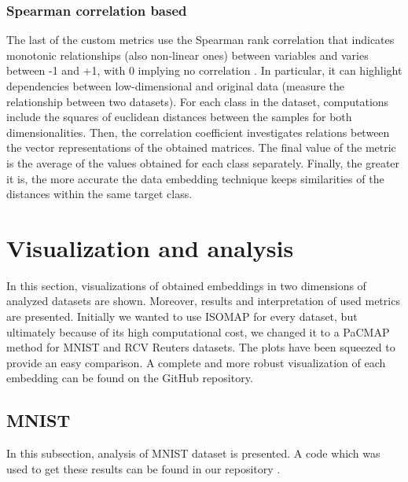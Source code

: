 \documentclass[12pt]{article}
\begin{document}
\subsubsection{Spearman correlation based}
The last of the custom metrics use the Spearman rank correlation that indicates monotonic relationships (also non-linear ones) between variables and varies between -1 and +1, with 0 implying no correlation \cite{spearman_description}. In particular, it can highlight dependencies between low-dimensional and original data (measure the relationship between two datasets). For each class in the dataset, computations include the squares of euclidean distances between the samples for both dimensionalities. Then, the correlation coefficient investigates relations between the vector representations of the obtained matrices. The final value of the metric is the average of the values obtained for each class separately. Finally, the greater it is, the more accurate the data embedding technique keeps similarities of the distances within the same target class.

\clearpage
\section{Visualization and analysis}

In this section, visualizations of obtained embeddings in two dimensions of analyzed datasets are shown. Moreover, results and interpretation of used metrics are presented. Initially we wanted to use ISOMAP for every dataset, but ultimately because of its high computational cost, we changed it to a PaCMAP method for MNIST and RCV Reuters datasets. The plots have been squeezed to provide an easy comparison. A complete and more robust visualization of each embedding can be found on the GitHub repository\cite{github-embeddings}.
\subsection{MNIST}
In this subsection, analysis of MNIST dataset is presented. A code which was used to get these results can be found in our repository \cite{github-mnist}.
\end{document}

